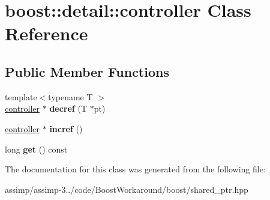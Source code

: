 \hypertarget{classboost_1_1detail_1_1controller}{\section{boost\+:\+:detail\+:\+:controller Class Reference}
\label{classboost_1_1detail_1_1controller}
}
\subsection*{Public Member Functions}
\begin{DoxyCompactItemize}
\item 
\hypertarget{classboost_1_1detail_1_1controller_adc3f7e8226506c9997b839b0d142aad8}{{\footnotesize template$<$typename T $>$ }\\\hyperlink{classboost_1_1detail_1_1controller}{controller} $\ast$ {\bfseries decref} (T $\ast$pt)}\label{classboost_1_1detail_1_1controller_adc3f7e8226506c9997b839b0d142aad8}

\item 
\hypertarget{classboost_1_1detail_1_1controller_ac4aa828e724e44bb7b8a543149e74d62}{\hyperlink{classboost_1_1detail_1_1controller}{controller} $\ast$ {\bfseries incref} ()}\label{classboost_1_1detail_1_1controller_ac4aa828e724e44bb7b8a543149e74d62}

\item 
\hypertarget{classboost_1_1detail_1_1controller_a9cb632a4559118fb9fae63e7523c9206}{long {\bfseries get} () const }\label{classboost_1_1detail_1_1controller_a9cb632a4559118fb9fae63e7523c9206}

\end{DoxyCompactItemize}


The documentation for this class was generated from the following file\+:\begin{DoxyCompactItemize}
\item 
assimp/assimp-\/3../code/\+Boost\+Workaround/boost/shared\+\_\+ptr.\+hpp\end{DoxyCompactItemize}
